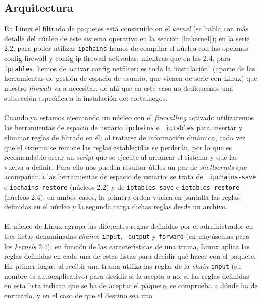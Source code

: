 \subsection{Arquitectura}
En Linux el filtrado de paquetes est\'a construido en el {\it kernel} (se
habla con m\'as detalle del n\'ucleo de este sistema operativo en la secci\'on
\ref{linkernel}); en la serie 2.2, para poder utilizar {\tt ipchains} hemos de 
compilar el n\'ucleo con las opciones {\sc config$\_$firewall} y {\sc 
config$\_$ip$\_$firewall} activadas, mientras que en las 2.4, para {\tt 
iptables}, hemos de activar {\sc config$\_$netfilter}: es toda la 
`instalaci\'on' (aparte de las herramientas de gesti\'on de espacio de usuario,
que vienen de serie con Linux) que nuestro {\it firewall} va a necesitar, de
ah\'{\i} que en este caso no dediquemos una subsecci\'on espec\'{\i}fica a la 
instalaci\'on del cortafuegos.\\
\\Cuando ya estamos ejecutando un n\'ucleo con el {\it firewalling} activado 
utilizaremos las herramientas de espacio de usuario {\tt ipchains} e {\tt 
iptables} para insertar y eliminar reglas de filtrado en \'el;
al tratarse de informaci\'on din\'amica, cada vez que el sistema se reinicie
las reglas establecidas se perder\'an, por lo que es recomendable crear un
{\it script} que se ejecute al arrancar el sistema y que las vuelva a definir.
Para ello nos pueden resultar \'utiles un par de {\it shellscripts} que 
acompa\~nan a las herramientas de espacio de usuario: se trata de {\tt 
ipchains-save} e {\tt ipchains-restore} (n\'ucleos 2.2) y de {\tt iptables-save}
e {\tt iptables-restore} (n\'ucleos 2.4); en ambos casos, la primera orden
vuelca en pantalla las reglas definidas en el n\'ucleo y la segunda carga 
dichas reglas desde un archivo.\\
\\El n\'ucleo de Linux agrupa las diferentes reglas definidas por el 
administrador en tres listas denominadas {\it chains}: {\tt input}, {\tt 
output} y {\tt forward} (en may\'usculas para los {\it kernels} 2.4); en 
funci\'on de las caracter\'{\i}sticas de una trama, Linux aplica las reglas 
definidas en cada una de estas listas para decidir qu\'e hacer con el paquete. 
En primer lugar, al recibir una trama utiliza las reglas de la {\it chain}
{\tt input} (su nombre es autoexplicativo) para decidir si la acepta o no; si
las reglas definidas en esta lista indican que se ha de aceptar el paquete, se
comprueba a d\'onde ha de enrutarlo, y en el caso de que el destino sea una 
